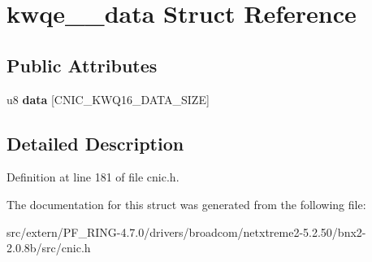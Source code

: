 \hypertarget{structkwqe__16__data}{
\section{kwqe\_\_\-data Struct Reference}
\label{structkwqe__16__data}
}
\subsection*{Public Attributes}
\begin{DoxyCompactItemize}
\item 
\hypertarget{structkwqe__16__data_abf650c0919b6482ef0a86d47c234b5d4}{
u8 {\bfseries data} \mbox{[}CNIC\_\-KWQ16\_\-DATA\_\-SIZE\mbox{]}}
\label{structkwqe__16__data_abf650c0919b6482ef0a86d47c234b5d4}

\end{DoxyCompactItemize}


\subsection{Detailed Description}


Definition at line 181 of file cnic.h.



The documentation for this struct was generated from the following file:\begin{DoxyCompactItemize}
\item 
src/extern/PF\_\-RING-\/4.7.0/drivers/broadcom/netxtreme2-\/5.2.50/bnx2-\/2.0.8b/src/cnic.h\end{DoxyCompactItemize}
